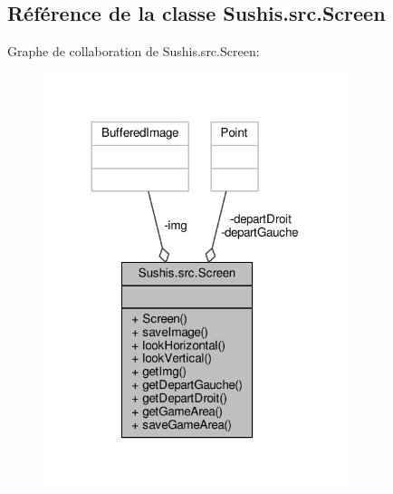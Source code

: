 \hypertarget{classSushis_1_1src_1_1Screen}{}\subsection{Référence de la classe Sushis.\+src.\+Screen}
\label{classSushis_1_1src_1_1Screen}


Graphe de collaboration de Sushis.\+src.\+Screen\+:\nopagebreak
\begin{figure}[H]
\begin{center}
\leavevmode
\includegraphics[width=251pt]{classSushis_1_1src_1_1Screen__coll__graph}
\end{center}
\end{figure}
